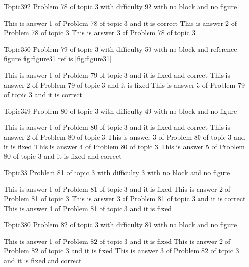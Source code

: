\documentclass[master]{exam}
\begin{document}
\begin{problem}{Topic3}{92}
	Problem 78 of topic 3 with difficulty 92 with no block and no figure
	\begin{answers}
		\answer[correct] This is answer 1 of Problem 78 of topic 3 and it is correct
		\answer This is answer 2 of Problem 78 of topic 3 
		\answer This is answer 3 of Problem 78 of topic 3 
	\end{answers}
\end{problem}

\begin{problem}{Topic3}{50}
	Problem 79 of topic 3 with difficulty 50 with no block and reference figure fig:figure31 ref is \ref{fig:figure31}
	\begin{answers}
		 This is answer 1 of Problem 79 of topic 3 and it is fixed and correct
		\answer[fixed] This is answer 2 of Problem 79 of topic 3 and it is fixed
		\answer[correct] This is answer 3 of Problem 79 of topic 3 and it is correct
	\end{answers}
\end{problem}

\begin{problem}{Topic3}{49}
	Problem 80 of topic 3 with difficulty 49 with no block and no figure
	\begin{answers}
		 This is answer 1 of Problem 80 of topic 3 and it is fixed and correct
		\answer This is answer 2 of Problem 80 of topic 3 
		\answer[fixed] This is answer 3 of Problem 80 of topic 3 and it is fixed
		\answer This is answer 4 of Problem 80 of topic 3 
		 This is answer 5 of Problem 80 of topic 3 and it is fixed and correct
	\end{answers}
\end{problem}

\begin{problem}{Topic3}{3}
	Problem 81 of topic 3 with difficulty 3 with no block and no figure
	\begin{answers}
		\answer[fixed] This is answer 1 of Problem 81 of topic 3 and it is fixed
		\answer This is answer 2 of Problem 81 of topic 3 
		\answer[correct] This is answer 3 of Problem 81 of topic 3 and it is correct
		\answer[fixed] This is answer 4 of Problem 81 of topic 3 and it is fixed
	\end{answers}
\end{problem}

\begin{problem}{Topic3}{80}
	Problem 82 of topic 3 with difficulty 80 with no block and no figure
	\begin{answers}
		\answer[fixed] This is answer 1 of Problem 82 of topic 3 and it is fixed
		\answer[fixed] This is answer 2 of Problem 82 of topic 3 and it is fixed
		 This is answer 3 of Problem 82 of topic 3 and it is fixed and correct
	\end{answers}
\end{problem}
\end{document}
